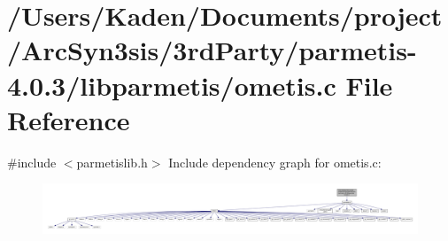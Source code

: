 \hypertarget{a00936}{}\section{/\+Users/\+Kaden/\+Documents/project/\+Arc\+Syn3sis/3rd\+Party/parmetis-\/4.0.3/libparmetis/ometis.c File Reference}
\label{a00936}
{\ttfamily \#include $<$parmetislib.\+h$>$}\newline
Include dependency graph for ometis.\+c\+:\nopagebreak
\begin{figure}[H]
\begin{center}
\leavevmode
\includegraphics[width=350pt]{a00937}
\end{center}
\end{figure}
